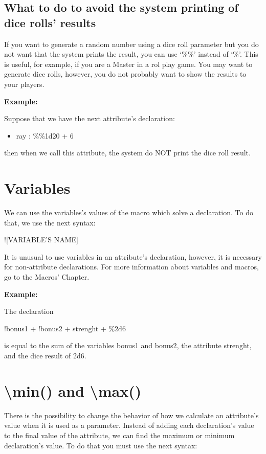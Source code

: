 \documentclass[11pt,a4paper,openright,oneside]{book}
\newenvironment{ex}
{
  \setlength{\parindent}{0cm}
  \large \textbf{Example:} \normalsize 
}
{}
\begin{document}
\subsection{What to do to avoid the system printing of dice rolls' results}

If you want to generate a random number using a dice roll parameter but you do not want that the system prints the result, you can use `\textsf{\%\%}' instead of `\textsf{\%}'. This is useful, for example, if you are a Master in a rol play game. You may want to generate dice rolls, however, you do not probably want to show the results to your players.

\begin{ex}
Suppose that we have the next attribute's declaration:
\begin{itemize}
  \item \textsf{ray : \%\%1d20 + 6}
\end{itemize}
then when we call this attribute, the system do NOT print the dice roll result.
\end{ex}

\section{Variables}

We can use the variables's values of the macro which solve a declaration. To do that, we use the next syntax:

\begin{center} \textsf{!\textsc{\scriptsize[VARIABLE'S NAME]}} \end{center}

It is unusual to use variables in an attribute's declaration, however, it is necessary for non-attribute declarations. For more information about variables and macros, go to the Macros' Chapter.

\begin{ex}
  The declaration

\textsf{!bonus1 + !bonus2 + strenght + \%2d6}

is equal to the sum of the variables \textsf{bonus1} and \textsf{bonus2}, the attribute \textsf{strenght}, and the dice result of 2d6.
\end{ex}


\section{\textsf{\textbackslash min()} and \textsf{\textbackslash max()}}
  There is the possibility to change the behavior of how we calculate an attribute's value when it is used as a parameter. Instead of adding each declaration's value to the final value of the attribute, we can find the maximum or minimum declaration's value. To do that you must use the next syntax:
\end{document}
